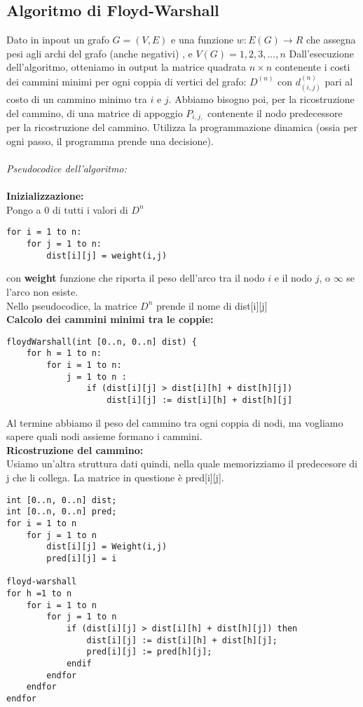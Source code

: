 \documentclass[main.tex]{subfiles}
\begin{document}
\subsection{Algoritmo di Floyd-Warshall}

Dato in inpout un grafo \(G=(V,E)\) e una funzione \(w:E(G)\to R\) che assegna pesi agli archi del grafo (anche negativi) , e \(V(G)={1,2,3,...,n}\)
Dall'esecuzione dell'algoritmo, otteniamo in output la matrice quadrata \(n \times n\) contenente i costi dei cammini minimi per ogni coppia di vertici del grafo:
\(D^{(n)}\) con \(d^{(n)}_{(i,j)}\) pari al costo di un cammino minimo tra \(i\) e  \(j\).
Abbiamo bisogno poi, per la ricostruzione del cammino, di una matrice di appoggio \(P_{i,j,}\) contenente  il nodo predecessore per la ricostruzione del cammino.
Utilizza la programmazione dinamica (ossia per ogni passo, il programma prende una decisione).
\\
\\
\textit{Pseudocodice dell'algoritmo:}
\\
\\
\textbf{Inizializzazione:}
\\
Pongo a 0 di tutti i valori di \(D^{n}\)
\begin{lstlisting}
for i = 1 to n:
    for j = 1 to n:
        dist[i][j] = weight(i,j)
\end{lstlisting}
con \textbf{weight} funzione che riporta il peso dell'arco tra il nodo \(i\) e il nodo \(j\), o \(\infty\) se l'arco non esiste.
\\
Nello pseudocodice, la matrice \(D^{n}\) prende il nome di dist[i][j]
\\
\textbf{Calcolo dei cammini minimi tra le coppie:}
\begin{lstlisting}
floydWarshall(int [0..n, 0..n] dist) { 
	for h = 1 to n:
    	for i = 1 to n:
        	j = 1 to n :
            	if (dist[i][j] > dist[i][h] + dist[h][j])
                	dist[i][j] := dist[i][h] + dist[h][j]
\end{lstlisting}
Al termine abbiamo il peso del cammino tra ogni coppia di nodi, ma vogliamo sapere quali nodi assieme formano i cammini.
\\
\textbf{Ricostruzione del cammino:}
\\
Usiamo un'altra struttura dati quindi, nella quale memorizziamo il predecesore di j che li collega. La matrice in questione è pred[i][j].
\begin{lstlisting}
int [0..n, 0..n] dist;
int [0..n, 0..n] pred;
for i = 1 to n
    for j = 1 to n
        dist[i][j] = Weight(i,j)
        pred[i][j] = i

floyd-warshall
for h =1 to n
    for i = 1 to n
        for j = 1 to n
            if (dist[i][j] > dist[i][h] + dist[h][j]) then
                dist[i][j] := dist[i][h] + dist[h][j];
                pred[i][j] := pred[h][j];
            endif
        endfor
    endfor
endfor
\end{lstlisting}
\end{document}
